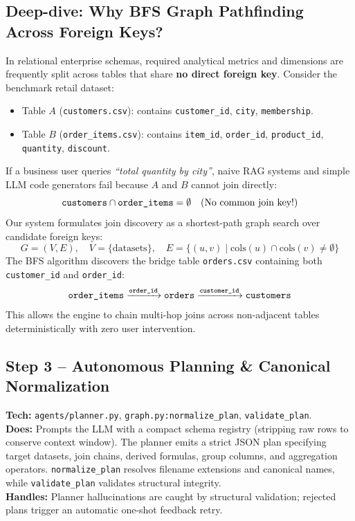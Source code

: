 \documentclass[11pt,a4paper]{article}
\begin{document}
\subsection{Deep-dive: Why BFS Graph Pathfinding Across Foreign Keys?}
In relational enterprise schemas, required analytical metrics and dimensions are frequently split across tables that share \textbf{no direct foreign key}. Consider the benchmark retail dataset:
\begin{itemize}[leftmargin=0.8cm]
\item Table $A$ (\texttt{customers.csv}): contains \texttt{customer\_id}, \texttt{city}, \texttt{membership}.
\item Table $B$ (\texttt{order\_items.csv}): contains \texttt{item\_id}, \texttt{order\_id}, \texttt{product\_id}, \texttt{quantity}, \texttt{discount}.
\end{itemize}
If a business user queries \emph{``total quantity by city''}, naive RAG systems and simple LLM code generators fail because $A$ and $B$ cannot join directly:
$$\text{\texttt{customers}} \cap \text{\texttt{order\_items}} = \emptyset \quad (\text{No common join key!})$$
Our system formulates join discovery as a shortest-path graph search over candidate foreign keys:
$$G = (V, E), \quad V = \{\text{datasets}\}, \quad E = \{(u, v) \mid \text{cols}(u) \cap \text{cols}(v) \neq \emptyset\}$$
The BFS algorithm discovers the bridge table \texttt{orders.csv} containing both \texttt{customer\_id} and \texttt{order\_id}:
$$\text{\texttt{order\_items}} \xrightarrow{\text{\texttt{order\_id}}} \text{\texttt{orders}} \xrightarrow{\text{\texttt{customer\_id}}} \text{\texttt{customers}}$$
This allows the engine to chain multi-hop joins across non-adjacent tables deterministically with zero user intervention.

\subsection{Step 3 -- Autonomous Planning \& Canonical Normalization}
\textbf{Tech:} \texttt{agents/planner.py}, \texttt{graph.py:normalize\_plan}, \texttt{validate\_plan}.\\
\textbf{Does:} Prompts the LLM with a compact schema registry (stripping raw rows to conserve context window). The planner emits a strict JSON plan specifying target datasets, join chains, derived formulas, group columns, and aggregation operators. \texttt{normalize\_plan} resolves filename extensions and canonical names, while \texttt{validate\_plan} validates structural integrity.\\
\textbf{Handles:} Planner hallucinations are caught by structural validation; rejected plans trigger an automatic one-shot feedback retry.
\end{document}
